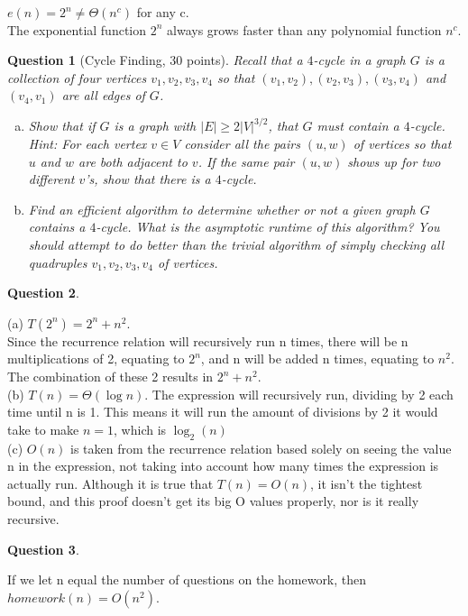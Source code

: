 \documentclass{article}
\newtheorem{ques}{Question}
\begin{document}
\noindent $e(n) = 2^n \neq \Theta(n^c)$ for any c.\\
The exponential function $2^n$ always grows faster than any polynomial function $n^c$.

\begin{ques}[Cycle Finding, 30 points]
Recall that a $4$-cycle in a graph $G$ is a collection of four vertices $v_1,v_2,v_3,v_4$ so that $(v_1,v_2),(v_2,v_3),(v_3,v_4)$ and $(v_4,v_1)$ are all edges of $G$.
\begin{enumerate}[(a)]
\item Show that if $G$ is a graph with $|E|\geq 2|V|^{3/2}$, that $G$ must contain a $4$-cycle. Hint: For each vertex $v\in V$ consider all the pairs $(u,w)$ of vertices so that $u$ and $w$ are both adjacent to $v$. If the same pair $(u,w)$ shows up for two different $v$'s, show that there is a $4$-cycle.
\item Find an efficient algorithm to determine whether or not a given graph $G$ contains a $4$-cycle. What is the asymptotic runtime of this algorithm? You should attempt to do better than the trivial algorithm of simply checking all quadruples $v_1,v_2,v_3,v_4$ of vertices.
\end{enumerate}
\end{ques}

\begin{ques}
\end{ques}

\noindent(a) $T(2^n) = 2^n + n^2$.\\
Since the recurrence relation will recursively run n times, there will be n multiplications of 2, equating to $2^n$, and n will be added n times, equating to $n^2$. The combination of these 2 results in $2^n + n^2$.\\

\noindent(b) $T(n) = \Theta(\log n)$.
The expression will recursively run, dividing by 2 each time until n is 1. This means it will run the amount of divisions by 2 it would take to make $n = 1$, which is $\log_2(n)$\\

\noindent(c) $O(n)$ is taken from the recurrence relation based solely on seeing the value n in the expression, not taking into account how many times the expression is actually run. Although it is true that $T(n) = O(n)$, it isn't the tightest bound, and this proof doesn't get its big O values properly, nor is it really recursive.

\begin{ques}
\end{ques}

If we let n equal the number of questions on the homework, then $homework(n) = O(n^2)$.
\end{document}
